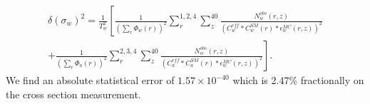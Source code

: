 \begin{multline}
\label{eqn:nomxsecerr}
\delta(\sigma_w)^2 = \frac{1}{T_w^2} \left[ \frac{1}{\left(\sum\limits_r \Phi_w(r)\right)^2} \sum\limits_{r}^{1,2,4} \sum\limits_{z}^{40} \frac{N^{obs}_w(r,z)}{(C_w^{eff}*C_w^{SM}(r)*\epsilon^{MC}_w(r,z))^2} \right. \\
	\left. +\frac{1}{\left(\sum\limits_r \Phi_a(r) \right)^2}\sum\limits_{r}^{2,3,4} \sum\limits_{z}^{40} \frac{N^{obs}_w(r,z)}{(C_a^{eff}*C_a^{SM}(r)*\epsilon^{MC}_w(r,z))^2}\right].
\end{multline}
We find an absolute statistical error of $1.57\times 10^{-40}$ which is 2.47\% fractionally on the cross section measurement.

